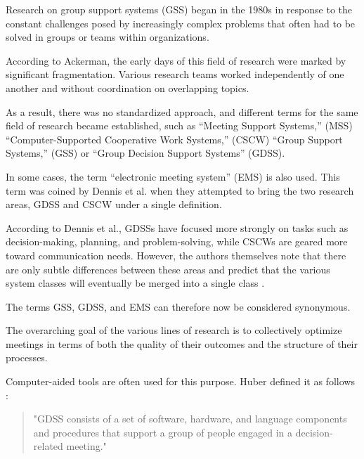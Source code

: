 Research on group support systems (GSS) began in the 1980s in response to the constant challenges posed by
increasingly complex problems that often had to be solved in groups or teams within organizations.
\cite[p. 628]{ackermannGroupSupportSystems2021}

According to Ackerman, the early days of this field of research were marked by significant fragmentation.
Various research teams worked independently of one another and without coordination on overlapping topics.
\cite[p.628]{ackermannGroupSupportSystems2021}

As a result, there was no standardized approach, and different terms for
the same field of research became established, such as “Meeting Support Systems,” (MSS) “Computer-Supported Cooperative
Work Systems,” (CSCW) “Group Support Systems,” (GSS) or “Group Decision Support Systems” (GDSS).
\cite[p.628f]{ackermannGroupSupportSystems2021}

In some cases, the term “electronic meeting system” (EMS) is also used. This term was coined by
Dennis et al. when they attempted to bring the two research areas, GDSS and CSCW under a single
definition. \cite[p. 592]{dennisInformationTechnologySupport1988}

According to Dennis et al., GDSSs have focused more strongly on tasks
such as decision-making, planning, and problem-solving, while CSCWs are geared more toward communication
needs. However, the authors themselves note that there are only subtle differences
between these areas and predict that the various system classes will eventually be merged into a single class
. \cite[p. 592]{dennisInformationTechnologySupport1988}

The terms GSS, GDSS, and EMS can therefore now be considered synonymous. \cite{ElectronicMeetingSystem2025}

The overarching goal of the various lines of research is to collectively optimize meetings in terms of
both the quality of their outcomes and the structure of their processes.
\cite[p.629]{ackermannGroupSupportSystems2021}

Computer-aided tools are often used for this purpose. Huber defined it as follows
\cite[p. 195]{huberIssuesDesignGroup1984a}:

\begin{quote}
  "GDSS consists of a set of software, hardware, and language components and procedures that support a group
  of people engaged in a decision-related meeting."
\end{quote}

